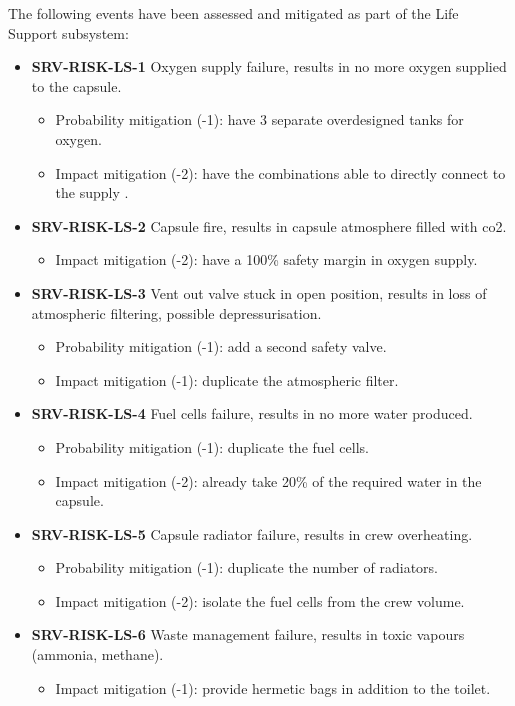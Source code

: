\noindent The following events have been assessed and mitigated as part of the Life Support subsystem:

\begin{itemize}
	 \item \textbf{SRV-RISK-LS-1} Oxygen supply failure, results in no more oxygen supplied to the capsule.
	\begin{itemize}
		 \item Probability mitigation (-1): have 3 separate overdesigned tanks for oxygen.		 \item Impact mitigation (-2): have the combinations able to directly connect to the supply .	\end{itemize}
	 \item \textbf{SRV-RISK-LS-2} Capsule fire, results in capsule atmosphere filled with co2.
	\begin{itemize}
		 \item Impact mitigation (-2): have a 100\% safety margin in oxygen supply.	\end{itemize}
	 \item \textbf{SRV-RISK-LS-3} Vent out valve stuck in open position, results in loss of atmospheric filtering, possible depressurisation.
	\begin{itemize}
		 \item Probability mitigation (-1): add a second safety valve.		 \item Impact mitigation (-1): duplicate the atmospheric filter.	\end{itemize}
	 \item \textbf{SRV-RISK-LS-4} Fuel cells failure, results in no more water produced.
	\begin{itemize}
		 \item Probability mitigation (-1): duplicate the fuel cells.		 \item Impact mitigation (-2): already take 20\% of the required water in the capsule.	\end{itemize}
	 \item \textbf{SRV-RISK-LS-5} Capsule radiator failure, results in crew overheating.
	\begin{itemize}
		 \item Probability mitigation (-1): duplicate the number of radiators.		 \item Impact mitigation (-2): isolate the fuel cells  from the crew volume.	\end{itemize}
	 \item \textbf{SRV-RISK-LS-6} Waste management failure, results in toxic vapours (ammonia, methane).
	\begin{itemize}
		 \item Impact mitigation (-1): provide hermetic bags in addition to the toilet.	\end{itemize}
\end{itemize}

